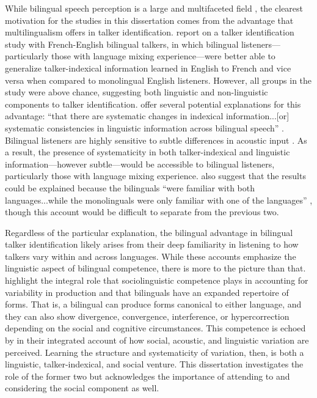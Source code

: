 While bilingual speech perception is a large and multifaceted field \citep{ingvalson_2014_bilingual}, the clearest motivation for the studies in this dissertation comes from the advantage that multilingualism offers in talker identification. \citet{orena_2019_identifying} report on a talker identification study with French-English bilingual talkers, in which bilingual listeners---particularly those with language mixing experience---were better able to generalize talker-indexical information learned in English to French and vice versa when compared to monolingual English listeners. However, all groups in the study were above chance, suggesting both linguistic and non-linguistic components to talker identification. \citeauthor{orena_2019_identifying} offer several potential explanations for this advantage: ``that there are systematic changes in indexical information...[or] systematic consistencies in linguistic information across bilingual speech'' \citeyearpar[][p. EL308]{orena_2019_identifying}. Bilingual listeners are highly sensitive to subtle differences in acoustic input \citep{ju_2004_falling}. As a result, the presence of systematicity in both talker-indexical and linguistic information---however subtle---would be accessible to bilingual listeners, particularly those with language mixing experience. \citeauthor{orena_2019_identifying} also suggest that the results could be explained because the bilinguals ``were familiar with both languages...while the monolinguals were only familiar with one of the languages'' \citeyearpar[][p. EL309]{orena_2019_identifying}, though this account would be difficult to separate from the previous two. 

Regardless of the particular explanation, the bilingual advantage in bilingual talker identification likely arises from their deep familiarity in listening to how talkers vary within and across languages. While these accounts emphasize the linguistic aspect of bilingual competence, there is more to the picture than that. \citet{bullock_2009_sociophonetics} highlight the integral role that sociolinguistic competence plays in accounting for variability in production and that bilinguals have an expanded repertoire of forms. That is, a bilingual can produce forms canonical to either language, and they can also show divergence, convergence, interference, or hypercorrection depending on the social and cognitive circumstances. This competence is echoed by \citet{kleinschmidt_2018_sociolinguistic} in their integrated account of how social, acoustic, and linguistic variation are perceived. Learning the structure and systematicity of variation, then, is both a linguistic, talker-indexical, and social venture. This dissertation investigates the role of the former two but acknowledges the importance of attending to and considering the social component as well.

